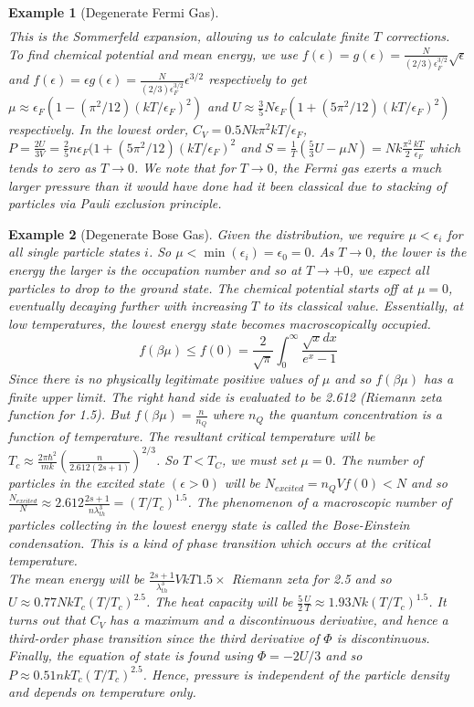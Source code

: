 \documentclass[a4paper]{article}
\newtheorem{eg}{Example}[section]
\theoremstyle{new}
\begin{document}
\begin{eg}[Degenerate Fermi Gas]
\begin{eqnarray}
\end{eqnarray}
This is the Sommerfeld expansion, allowing us to calculate finite $T$ corrections. To find chemical potential and mean energy, we use $f(\epsilon)=g(\epsilon)=\frac{N}{(2/3)\epsilon_F^{3/2}}\sqrt{\epsilon}$ and $f(\epsilon)=\epsilon g(\epsilon)=\frac{N}{(2/3)\epsilon_F^{3/2}}\epsilon^{3/2}$ respectively to get $\mu\approx\epsilon_F(1-(\pi^2/12)(kT/\epsilon_F)^2)$ and $U\approx\frac{3}{5}N\epsilon_F(1+(5\pi^2/12)(kT/\epsilon_F)^2)$ respectively. In the lowest order, $C_V=0.5Nk\pi^2kT/\epsilon_F$, $P=\frac{2U}{3V}=\frac{2}{5}n\epsilon_F(1+(5\pi^2/12)(kT/\epsilon_F)^2$ and $S=\frac{1}{T}(\frac{5}{3}U-\mu N)=Nk\frac{\pi^2}{2}\frac{kT}{\epsilon_F}$ which tends to zero as $T\rightarrow 0$. We note that for $T\rightarrow 0$, the Fermi gas exerts a much larger pressure than it would have done had it been classical due to stacking of particles via Pauli exclusion principle.
\end{eg}
\begin{eg}[Degenerate Bose Gas]
Given the distribution, we require $\mu<\epsilon_i$ for all single particle states $i$. So $\mu<\min(\epsilon_i)=\epsilon_0=0$. As $T\rightarrow0$, the lower is the energy the larger is the occupation number and so at $T\rightarrow +0$, we expect all particles to drop to the ground state. The chemical potential starts off at $\mu=0$, eventually decaying further with increasing $T$ to its classical value. Essentially, at low temperatures, the lowest energy state becomes macroscopically occupied. 
$$f(\beta\mu)\leq f(0)=\frac{2}{\sqrt{\pi}}\int_0^\infty\frac{\sqrt{x}dx}{e^x-1}$$
Since there is no physically legitimate positive values of $\mu$ and so $f(\beta\mu)$ has a finite upper limit. The right hand side is evaluated to be 2.612 (Riemann zeta function for 1.5). But $f(\beta\mu)=\frac{n}{n_Q}$ where $n_Q$ the quantum concentration is a function of temperature. The resultant critical temperature will be $T_c\approx\frac{2\pi\hbar^2}{mk}(\frac{n}{2.612(2s+1)})^{2/3}$. So $T<T_C$, we must set $\mu=0$. The number of particles in the excited state $(\epsilon>0)$ will be $N_{excited}=n_QVf(0)<N$ and so $\frac{N_{excited}}{N}\approx2.612\frac{2s+1}{n\lambda_{th}^3}=(T/T_c)^{1.5}$. The phenomenon of a macroscopic number of particles collecting in the lowest energy state is called the Bose-Einstein condensation. This is a kind of phase transition which occurs at the critical temperature.\\[5pt]
The mean energy will be $\frac{2s+1}{\lambda_{th}^3}VkT1.5\times$ Riemann zeta for 2.5 and so $U\approx0.77NkT_c(T/T_c)^{2.5}$. The heat capacity will be $\frac{5}{2}\frac{U}{T}\approx1.93Nk(T/T_c)^{1.5}$. It turns out that $C_V$ has a maximum and a discontinuous derivative, and hence a third-order phase transition since the third derivative of $\Phi$ is discontinuous. Finally, the equation of state is found using $\Phi=-2U/3$ and so $P\approx0.51nkT_c(T/T_c)^{2.5}$. Hence, pressure is independent of the particle density and depends on temperature only.
\end{eg}
\newpage
\end{document}
